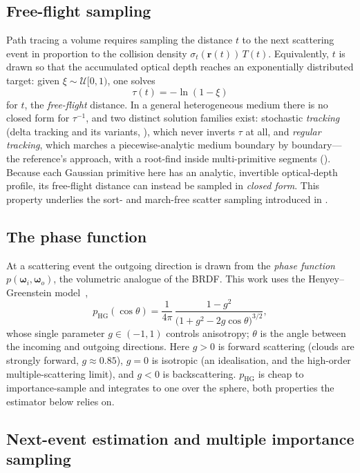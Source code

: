 \subsection{Free-flight sampling}

Path tracing a volume requires sampling the distance $t$ to the next scattering event in proportion
to the collision density $\sigma_t(\bm{r}(t))\,T(t)$. Equivalently, $t$ is drawn so that the
accumulated optical depth reaches an exponentially distributed target: given $\xi\sim\mathcal{U}[0,1)$,
one solves
\[
  \tau(t) = -\ln(1-\xi)
\]
for $t$, the \emph{free-flight} distance. In a general heterogeneous medium there is no
closed form for $\tau^{-1}$, and two distinct solution families exist: stochastic
\emph{tracking} (delta tracking and its variants, ), which never
inverts $\tau$ at all, and \emph{regular tracking}, which marches a piecewise-analytic
medium boundary by boundary---the reference's approach, with a root-find inside
multi-primitive segments (). Because each Gaussian primitive here has an analytic,
invertible optical-depth profile, its free-flight distance can instead be sampled in \emph{closed
form}. This property underlies the sort- and march-free scatter sampling introduced in
.

\subsection{The phase function}

At a scattering event the outgoing direction is drawn from the \emph{phase function}
$p(\bm{\omega}_i,\bm{\omega}_o)$, the volumetric analogue of the BRDF. This work uses the
Henyey--Greenstein model~\cite{HenyeyGreenstein1941},
\[
  p_{\mathrm{HG}}(\cos\theta) =
  \frac{1}{4\pi}\,\frac{1-g^{2}}{\big(1+g^{2}-2g\cos\theta\big)^{3/2}},
\]
whose single parameter $g\in(-1,1)$ controls anisotropy; $\theta$ is the angle between the incoming
and outgoing directions. Here $g>0$ is forward scattering (clouds are strongly forward, $g\approx 0.85$),
$g=0$ is isotropic (an idealisation, and the high-order multiple-scattering limit), and $g<0$ is
backscattering. $p_{\mathrm{HG}}$ is
cheap to importance-sample and integrates to one over the sphere, both properties the estimator
below relies on.

\subsection{Next-event estimation and multiple importance sampling}
\label{sec:nee-mis}

